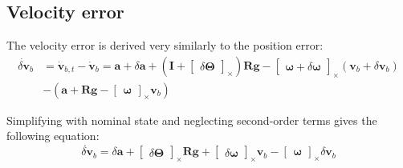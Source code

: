 \subsection{Velocity error}

The velocity error is derived very similarly to the position error:
\begin{equation}
    \begin{aligned}
        \dot{\delta\mathbf{v}}_b&=\dot{\mathbf{v}}_{b,t}-\dot{\mathbf{v}}_b 
        =\mathbf{a}+\delta\mathbf{a}+\left(\mathbf{I}+\begin{bmatrix} \delta\boldsymbol{\Theta} \end{bmatrix}_\times\right)
        \mathbf{R}\mathbf{g}-\begin{bmatrix} \boldsymbol{\omega}+\delta\boldsymbol{\omega} \end{bmatrix}_\times (\mathbf{v}_b+\delta\mathbf{v}_b) \\ &
        -(\mathbf{a}+\mathbf{R}\mathbf{g}-\begin{bmatrix} \boldsymbol{\omega} \end{bmatrix}_\times \mathbf{v}_b)
    \end{aligned}
\end{equation}

Simplifying with nominal state and neglecting second-order terms gives the following equation:
\begin{equation}
    \dot{\delta\mathbf{v}}_b=\delta\mathbf{a}+\begin{bmatrix}
        \delta\boldsymbol{\Theta}
    \end{bmatrix}_\times\mathbf{R}\mathbf{g}+\begin{bmatrix}
        \delta\boldsymbol{\omega}
    \end{bmatrix}_\times\mathbf{v}_b-\begin{bmatrix}
        \boldsymbol{\omega}
    \end{bmatrix}_\times\delta\mathbf{v}_b
\end{equation}

